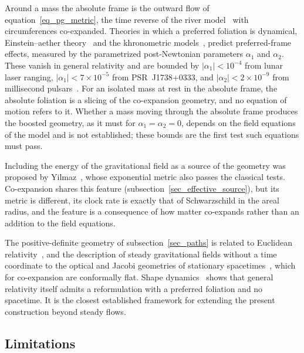 \documentclass{iopjournal}
\begin{document}
Around a mass the absolute frame is the outward flow of equation~\eqref{eq_pg_metric}, the time reverse of the river model~\cite{HamiltonLisle2008} with circumferences co-expanded. Theories in which a preferred foliation is dynamical, Einstein--aether theory~\cite{JacobsonMattingly2001} and the khronometric models~\cite{BlasPujolasSibiryakov2011}, predict preferred-frame effects, measured by the parametrized post-Newtonian parameters $\alpha_1$ and $\alpha_2$. These vanish in general relativity and are bounded by $|\alpha_1|<10^{-4}$ from lunar laser ranging, $|\alpha_1|<7\times10^{-5}$ from PSR~J1738+0333, and $|\alpha_2|<2\times10^{-9}$ from millisecond pulsars~\cite{Will2014}. For an isolated mass at rest in the absolute frame, the absolute foliation is a slicing of the co-expansion geometry, and no equation of motion refers to it. Whether a mass moving through the absolute frame produces the boosted geometry, as it must for $\alpha_1=\alpha_2=0$, depends on the field equations of the model and is not established; these bounds are the first test such equations must pass.

Including the energy of the gravitational field as a source of the geometry was proposed by Yilmaz~\cite{Yilmaz1958}, whose exponential metric also passes the classical tests. Co-expansion shares this feature (subsection~\ref{sec_effective_source}), but its metric is different, its clock rate is exactly that of Schwarzschild in the areal radius, and the feature is a consequence of how matter co-expands rather than an addition to the field equations.

The positive-definite geometry of subsection~\ref{sec_paths} is related to Euclidean relativity~\cite{Montanus2001,Almeida2001}, and the description of steady gravitational fields without a time coordinate to the optical and Jacobi geometries of stationary spacetimes~\cite{GibbonsZermelo2009,Gibbons2016Jacobi}, which for co-expansion are conformally flat. Shape dynamics~\cite{GomesGrybKoslowski2011} shows that general relativity itself admits a reformulation with a preferred foliation and no spacetime. It is the closest established framework for extending the present construction beyond steady flows.

\subsection{Limitations}
\end{document}
